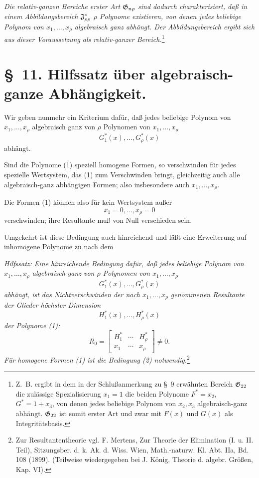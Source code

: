 \emph{Die relativ-ganzen Bereiche erster Art $\mathfrak{G}_{n\rho}$ sind dadurch charakterisiert, daß in einem Abbildungsbereich $\mathfrak{J}^*_{\rho\rho}$ $\rho$ Polynome existieren, von denen jedes beliebige Polynom von $x_1,
\ldots,x_\rho$ algebraisch ganz abhängt. Der Abbildungsbereich ergibt sich aus dieser Voraussetzung als relativ-ganzer Bereich.}\footnote{Z.~B. ergibt in dem in der Schlußanmerkung zu \S\ 9 erwähnten Bereich $\mathfrak{G}_{22}$ die zulässige Spezialisierung $x_1=1$ die beiden Polynome $F^*=x_2$, $G^*=1+x_3$, von denen jedes beliebige Polynom von $x_2,x_3$ algebraisch-ganz abhängt. $\mathfrak{G}_{22}$ ist somit erster Art und zwar mit $F(x)$ und $G(x)$ als Integritätsbasis.}

\section*{\S\ 11. Hilfssatz über algebraisch-ganze Abhängigkeit.}

Wir geben nunmehr ein Kriterium dafür, daß jedes beliebige Polynom von $x_1,
\ldots,x_\rho$ algebraisch ganz von $\rho$ Polynomen von $x_1,
\ldots,x_\rho$
\begin{equation}
  G_1^*(x),\ldots,G_\rho^*(x)
\tag{1}
\end{equation}
abhängt.

Sind die Polynome (1) speziell homogene Formen, so verschwinden für jedes spezielle Wertsystem, das (1) zum Verschwinden bringt, gleichzeitig auch alle algebraisch-ganz abhängigen Formen; also insbesondere auch $x_1,
\ldots,x_\rho$.

Die Formen (1) können also für kein Wertsystem außer
\[
  x_1=0,
  \ldots,
  x_\rho=0
\]
verschwinden; ihre Resultante muß von Null verschieden sein.

Umgekehrt ist diese Bedingung auch hinreichend und läßt eine Erweiterung auf inhomogene Polynome zu nach dem

\emph{Hilfssatz: Eine hinreichende Bedingung dafür, daß jedes beliebige Polynom von $x_1,
\ldots,x_\rho$ algebraisch-ganz von $\rho$ Polynomen von $x_1,
\ldots,x_\rho$
\[
  G_1^*(x),\ldots,G_\rho^*(x)
\]
abhängt, ist das Nichtverschwinden der nach $x_1,
\ldots,x_\rho$ genommenen Resultante der Glieder höchster Dimension}
\[
  H_1^*(x),\ldots,H_\rho^*(x)
\]
\emph{der Polynome (1):}
\begin{equation}
  R_0=\left[
  \begin{array}{ccc}
    H_1^*&\cdots&H_\rho^*\\
    x_1&\cdots&x_\rho
  \end{array}
  \right]\ne0.
\tag{2}
\end{equation}
\emph{Für homogene Formen (1) ist die Bedingung (2) notwendig.}\footnote{Zur Resultantentheorie vgl. F. Mertens, Zur Theorie der Elimination (I. u. II. Teil), Sitzungsber. d. k. Ak. d. Wiss. Wien, Math.-naturw. Kl. Abt. IIa, Bd. 108 (1899). (Teilweise wiedergegeben bei J. König, Theorie d. algebr. Größen, Kap. VI).}

